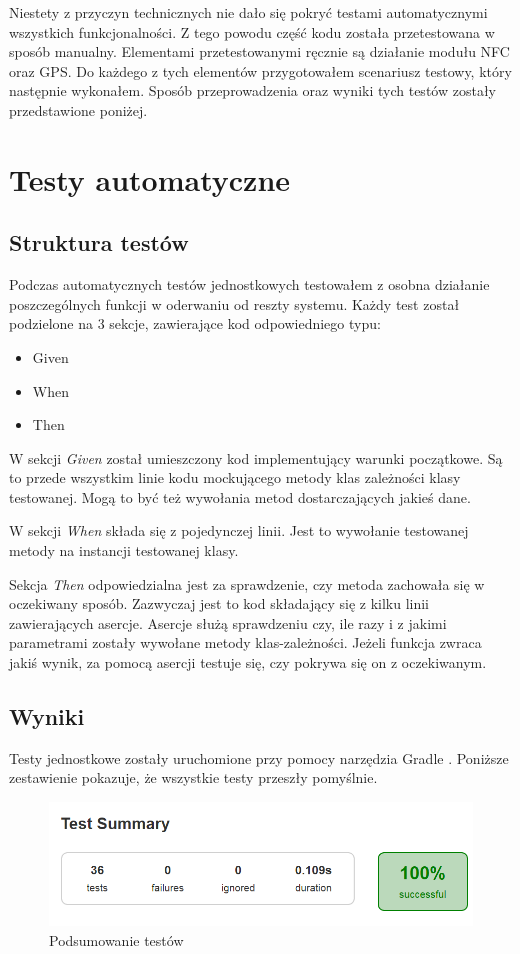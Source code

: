 \documentclass	{xmgr}
\begin{document}
Niestety z przyczyn technicznych nie dało się pokryć testami automatycznymi wszystkich funkcjonalności. Z tego powodu część kodu została przetestowana w sposób manualny. Elementami przetestowanymi ręcznie są działanie modułu NFC oraz GPS. Do każdego z tych elementów przygotowałem scenariusz testowy, który następnie wykonałem. Sposób przeprowadzenia oraz wyniki tych testów zostały przedstawione poniżej.

\section{Testy automatyczne}
\subsection{Struktura testów}
Podczas  automatycznych testów jednostkowych testowałem z osobna działanie poszczególnych funkcji w oderwaniu od reszty systemu. Każdy test został podzielone na 3 sekcje, zawierające kod odpowiedniego typu:
\begin{itemize}
\item Given
\item When
\item Then
\end{itemize}

W sekcji \textit{Given} został umieszczony kod implementujący warunki początkowe. Są to przede wszystkim linie kodu mockującego metody klas zależności klasy testowanej. Mogą to być też wywołania metod dostarczających jakieś dane. 

W sekcji \textit{When} składa się z pojedynczej linii. Jest to wywołanie testowanej metody na instancji testowanej klasy.

Sekcja \textit{Then} odpowiedzialna jest za sprawdzenie, czy metoda zachowała się w oczekiwany sposób. Zazwyczaj jest to kod składający się z kilku linii zawierających asercje. Asercje służą sprawdzeniu czy, ile razy i z jakimi parametrami zostały wywołane metody klas-zależności. Jeżeli funkcja zwraca jakiś wynik, za pomocą asercji testuje się, czy pokrywa się on z oczekiwanym.

\subsection{Wyniki}
Testy jednostkowe zostały uruchomione przy pomocy narzędzia Gradle \cite{Gradle:2017:Doc}. Poniższe zestawienie pokazuje, że wszystkie testy przeszły pomyślnie.

\begin{figure}[!tbh]
	\centering
	\includegraphics[width=1.0\hsize]{fig/test_summary}
	\caption{Podsumowanie testów}
\end{figure}
\end{document}
